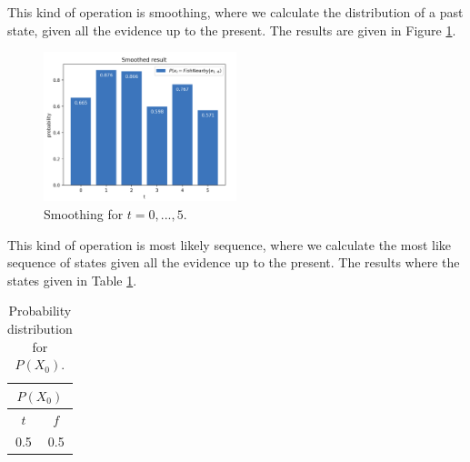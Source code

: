 \documentclass[11pt, a4paper, english]{NTNUoving}
\begin{document}
\begin{oppgave}
\begin{punkt}
    This kind of operation is smoothing, where we calculate the distribution of a past state, given all the evidence up to the present.
    The results are given in Figure \ref{fig:smoothing}.

    \begin{figure}[H]
        \centering
        \includegraphics[width=0.5\textwidth]{smoothing.png}
        \caption{Smoothing for $t = 0,...,5$.}
        \label{fig:smoothing}
    \end{figure}
\end{punkt}

\begin{punkt}
    This kind of operation is most likely sequence, where we calculate the most like sequence of states given all the evidence up to the present.
    The results where the states given in Table \ref{tab:4}.

    \begin{table}[H]
        \centering
        \begin{tabular}{|c|c|}
            \hline
           \multicolumn{2}{|c|}{$P(X_0)$} \\ [0.5ex]
            \hline
            $t$ & $f$ \\
            \hline
            0.5 & 0.5 \\ [1.0ex]
            \hline
    \end{tabular}
        \caption{Probability distribution for $P(X_0)$.}
        \label{tab:4}
    \end{table}
\end{punkt}

\end{oppgave}
\end{document}
